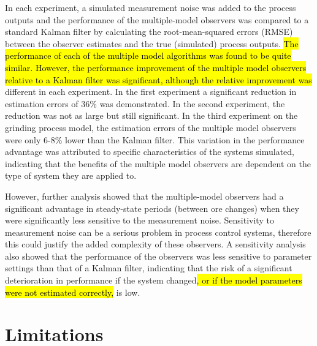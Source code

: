 In each experiment, a simulated measurement noise was added to the process outputs and the performance of the multiple-model observers was compared to a standard Kalman filter by calculating the root-mean-squared errors (\gls{RMSE}) between the observer estimates and the true (simulated) process outputs. \hl{The performance of each of the multiple model algorithms was found to be quite similar. However, the performance improvement of the multiple model observers relative to a Kalman filter was significant, although the relative improvement was} different in each experiment. In the first experiment a significant reduction in estimation errors of 36\% was demonstrated. In the second experiment, the reduction was not as large but still significant. In the third experiment on the grinding process model, the estimation errors of the multiple model observers were only 6-8\% lower than the Kalman filter. This variation in the performance advantage was attributed to specific characteristics of the systems simulated, indicating that the benefits of the multiple model observers are dependent on the type of system they are applied to.

However, further analysis showed that the multiple-model observers had a significant advantage in steady-state periods (between ore changes) when they were significantly less sensitive to the measurement noise. Sensitivity to measurement noise can be a serious problem in process control systems, therefore this could justify the added complexity of these observers. A sensitivity analysis also showed that the performance of the observers was less sensitive to parameter settings than that of a Kalman filter, indicating that the risk of a significant deterioration in performance if the system changed\hl{, or if the model parameters were not estimated correctly,} is low.

\section*{Limitations}

